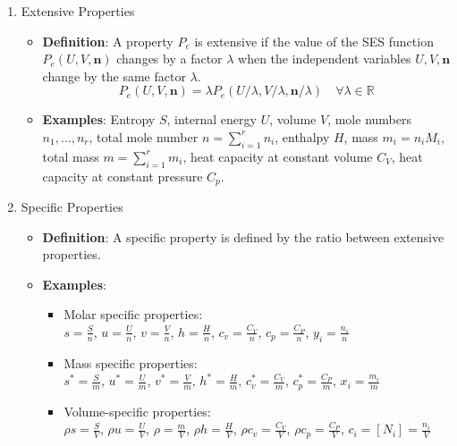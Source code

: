 \begin{defn}
\noindent
\begin{enumerate}
    \item Extensive Properties
    \begin{itemize}
        \item \textbf{Definition}: A property \( P_e \) is extensive if the value of the SES function \( P_e(U,V,\mathbf{n}) \) changes by a factor \(\lambda\) when the independent variables \( U, V, \mathbf{n} \) change by the same factor \(\lambda\).
        \[
        P_e(U,V,\mathbf{n}) = \lambda P_e(U/\lambda, V/\lambda, \mathbf{n}/\lambda) \quad \forall \lambda \in \mathbb{R}
        \]
        \item \textbf{Examples}: Entropy \( S \), internal energy \( U \), volume \( V \), mole numbers \( n_1, \ldots, n_r \), total mole number \( n = \sum_{i=1}^r n_i \), enthalpy \( H \), mass \( m_i = n_i M_i \), total mass \( m = \sum_{i=1}^r m_i \), heat capacity at constant volume \( C_V \), heat capacity at constant pressure \( C_p \).
    \end{itemize}
    \item Specific Properties
    \begin{itemize}
        \item \textbf{Definition}: A specific property is defined by the ratio between extensive properties.
        \item \textbf{Examples}:
        \begin{itemize}
            \item Molar specific properties:\\ \( s = \frac{S}{n} \), \( u = \frac{U}{n} \), \( v = \frac{V}{n} \), 
            \( h = \frac{H}{n} \), \( c_v = \frac{C_V}{n} \), \( c_p = \frac{C_P}{n} \), \( y_i = \frac{n_i}{n} \)
            \item Mass specific properties:\\ \( s^* = \frac{S}{m} \), \( u^* = \frac{U}{m} \), \( v^* = \frac{V}{m} \), 
            \( h^* = \frac{H}{m} \), \( c_v^* = \frac{C_V}{m} \), \( c_p^* = \frac{C_P}{m} \), \( x_i = \frac{m_i}{m} \)
            \item Volume-specific properties:\\ \( \rho s = \frac{S}{V} \), \( \rho u = \frac{U}{V} \), \( \rho = \frac{m}{V} \), 
            \( \rho h = \frac{H}{V} \), \( \rho c_v = \frac{C_V}{V} \), \( \rho c_p = \frac{C_P}{V} \), \( c_i = [N_i] = \frac{n_i}{V} \)
        \end{itemize}
    \end{itemize}

\end{enumerate}
\end{defn}
